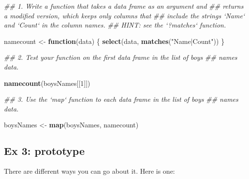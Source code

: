 \documentclass[]{book}
\newenvironment{Shaded}{\begin{snugshade}}{\end{snugshade}}
\newcommand{\CommentTok}[1]{\textcolor[rgb]{0.56,0.35,0.01}{\textit{#1}}}
\newcommand{\ControlFlowTok}[1]{\textcolor[rgb]{0.13,0.29,0.53}{\textbf{#1}}}
\newcommand{\DecValTok}[1]{\textcolor[rgb]{0.00,0.00,0.81}{#1}}
\newcommand{\KeywordTok}[1]{\textcolor[rgb]{0.13,0.29,0.53}{\textbf{#1}}}
\newcommand{\NormalTok}[1]{#1}
\newcommand{\StringTok}[1]{\textcolor[rgb]{0.31,0.60,0.02}{#1}}
\begin{document}
\begin{Shaded}
\begin{Highlighting}[]
  \CommentTok{## 1. Write a function that takes a data frame as an argument and}
  \CommentTok{##   returns a modified version, which keeps only columns that}
  \CommentTok{##   include the strings `Name` and `Count` in the column names.}
  \CommentTok{##   HINT: see the `?matches` function.}

\NormalTok{  namecount <-}\StringTok{ }\ControlFlowTok{function}\NormalTok{(data) \{}
      \KeywordTok{select}\NormalTok{(data, }\KeywordTok{matches}\NormalTok{(}\StringTok{"Name|Count"}\NormalTok{))}
\NormalTok{  \}}
     
  \CommentTok{## 2. Test your function on the first data frame in the list of boys}
  \CommentTok{##    names data.}

  \KeywordTok{namecount}\NormalTok{(boysNames[[}\DecValTok{1}\NormalTok{]])}
  
  \CommentTok{## 3. Use the `map` function to each data frame in the list of boys}
  \CommentTok{##    names data.}

\NormalTok{  boysNames <-}\StringTok{ }\KeywordTok{map}\NormalTok{(boysNames, namecount)}
\end{Highlighting}
\end{Shaded}

\hypertarget{ex-3-prototype-3}{%
\subsection{Ex 3: prototype}\label{ex-3-prototype-3}}

There are different ways you can go about it. Here is one:
\end{document}
